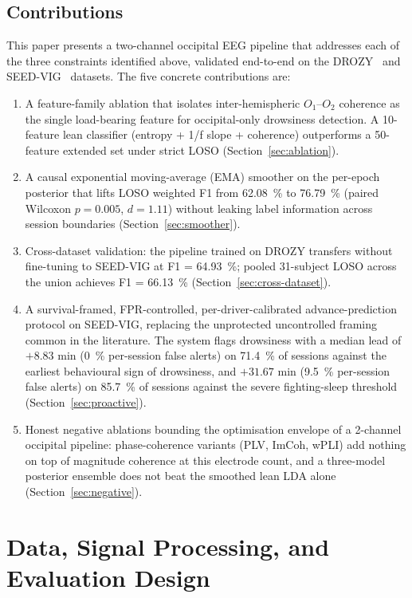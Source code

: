 \documentclass[journal]{IEEEtran}
\DeclareRobustCommand{\add}[1]{#1}                         %
\DeclareRobustCommand{\del}[1]{}                           %
\DeclareRobustCommand{\add}[1]{\hl{#1}}
\DeclareRobustCommand{\del}[1]{{\color{delred}\sout{#1}}\,}
\DeclareRobustCommand{\del}[1]{}                         %
\DeclareRobustCommand{\chg}[2]{\del{#1}\add{#2}}
\begin{document}
\subsection{\add{Contributions}}
\label{sec:contributions}
This paper presents a two-channel occipital EEG pipeline that addresses each of the three constraints identified above, validated end-to-end on the DROZY~\cite{drozy2016} and SEED-VIG~\cite{zheng2017seedvig} datasets. The five concrete contributions are:
\begin{enumerate}
    \item A feature-family ablation that isolates inter-hemispheric \(O_1\)--\(O_2\) coherence as the single load-bearing feature for occipital-only drowsiness detection. A 10-feature lean classifier (entropy + 1/f slope + coherence) outperforms a 50-feature extended set under strict LOSO (Section~\ref{sec:ablation}).
    \item A causal exponential moving-average (EMA) smoother on the per-epoch posterior that lifts LOSO weighted F1 from 62.08~\% to 76.79~\% (paired Wilcoxon \(p=0.005\), \(d=1.11\)) without leaking label information across session boundaries (Section~\ref{sec:smoother}).
    \item Cross-dataset validation: the pipeline trained on DROZY transfers without fine-tuning to SEED-VIG at F1 = 64.93~\%; pooled 31-subject LOSO across the union achieves F1 = 66.13~\% (Section~\ref{sec:cross-dataset}).
    \item A survival-framed, FPR-controlled, per-driver-calibrated advance-prediction protocol on SEED-VIG, replacing the unprotected uncontrolled framing common in the literature. The system flags drowsiness with a median lead of \(+8.83\) min (0~\% per-session false alerts) on 71.4~\% of sessions against the earliest behavioural sign of drowsiness, and \(+31.67\) min (9.5~\% per-session false alerts) on 85.7~\% of sessions against the severe fighting-sleep threshold (Section~\ref{sec:proactive}).
    \item Honest negative ablations bounding the optimisation envelope of a 2-channel occipital pipeline: phase-coherence variants (PLV, ImCoh, wPLI) add nothing on top of magnitude coherence at this electrode count, and a three-model posterior ensemble does not beat the smoothed lean LDA alone (Section~\ref{sec:negative}).
\end{enumerate}

\section{\chg{Methods}{Data, Signal Processing, and Evaluation Design}}
\label{sec:methods}
\end{document}
